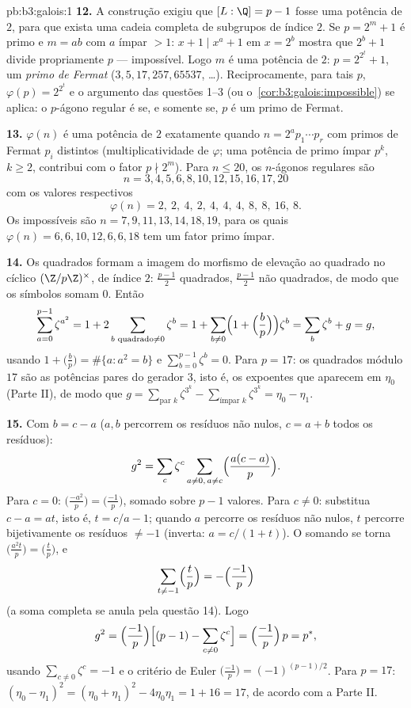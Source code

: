 \begin{solution}{pb:b3:galois:1}
\textbf{12.} A construção exigiu que $[L:\Q] = p - 1$ fosse uma
potência de $2$, para que exista uma cadeia completa de subgrupos
de índice $2$. Se $p = 2^m + 1$ é primo e $m = ab$ com $a$ ímpar
$>
1$: $x + 1 \mid x^a + 1$ em $x = 2^b$ mostra que $2^b + 1$ divide
propriamente $p$ --- impossível. Logo $m$ é uma potência de
$2$: $p =
2^{2^t} + 1$, um \emph{primo de Fermat} ($3, 5, 17, 257, 65537$,
\dots). Reciprocamente, para tais $p$, $\varphi(p) = 2^{2^t}$ e o
argumento das questões 1--3 (ou
o~\cref{cor:b3:galois:impossible}) se aplica: o $p$-ágono regular
é  se, e somente se, $p$ é um primo de Fermat.

\textbf{13.} $\varphi(n)$ é uma potência de $2$ exatamente quando $n =
2^a p_1\cdots p_r$ com primos de Fermat $p_i$ distintos
(multiplicatividade de $\varphi$; uma potência de primo ímpar $p^k$, $k
\geq 2$, contribui com o fator $p \nmid 2^m$). Para $n \leq
20$, os $n$-ágonos regulares  são
\[
n = 3, 4, 5, 6, 8, 10, 12, 15, 16, 17, 20
\]
com os valores respectivos
\[
\varphi(n) = 2,\ 2,\ 4,\ 2,\ 4,\ 4,\ 4,\ 8,\ 8,\ 16,\ 8 .
\]
Os impossíveis são $n = 7, 9, 11, 13, 14, 18, 19$, para os quais
$\varphi(n) = 6, 6, 10, 12, 6, 6, 18$ tem um fator primo ímpar.

\textbf{14.} Os quadrados formam a imagem do morfismo de elevação ao
quadrado no cíclico $(\Z/p\Z)^\times$, de índice $2$:
$\frac{p-1}2$ quadrados, $\frac{p-1}2$ não quadrados, de modo que os
símbolos somam $0$. Então
\[
\sum_{a=0}^{p-1}\zeta^{a^2} = 1 + 2\sum_{b \text{ quadrado}
\neq 0}\zeta^b
= 1 + \sum_{b\neq0}\Bigl(1 + \Bigl(\frac bp\Bigr)\Bigr)
\zeta^b = \sum_{b}\zeta^b + g = g,
\]
usando $1 + \bigl(\frac bp\bigr) = \#\{a : a^2 = b\}$ e
$\sum_{b=0}^{p-1}\zeta^b = 0$. Para $p = 17$: os quadrados módulo
$17$ são as potências pares do gerador $3$, isto é, os
expoentes que aparecem em $\eta_0$ (Parte II), de modo que $g =
\sum_{\text{par }k}\zeta^{3^k} - \sum_{\text{ímpar }k}
\zeta^{3^k} = \eta_0 - \eta_1$.

\textbf{15.} Com $b = c - a$ ($a, b$ percorrem os resíduos
não nulos, $c = a + b$ todos os resíduos):
\[
g^2 = \sum_c\zeta^c\sum_{a\neq0,\,a\neq c}
\Bigl(\frac{a(c-a)}p\Bigr) .
\]
Para $c = 0$: $\bigl(\frac{-a^2}p\bigr) =
\bigl(\frac{-1}p\bigr)$, somado sobre $p - 1$ valores. Para $c \neq 0$: substitua $c - a = at$, isto é, $t = c/a -
1$; quando $a$ percorre os resíduos não nulos, $t$ percorre
bijetivamente os resíduos $\neq -1$ (inverta: $a = c/(1 +
t)$). O somando se torna $\bigl(\frac{a^2t}p\bigr) =
\bigl(\frac tp\bigr)$, e
\[
\sum_{t \neq -1}\Bigl(\frac tp\Bigr)
= -\Bigl(\frac{-1}p\Bigr)
\]
(a soma completa se anula pela questão 14). Logo
\[
g^2 = \Bigl(\frac{-1}p\Bigr)\Bigl[(p-1) -
\sum_{c\neq0}\zeta^c\Bigr]
= \Bigl(\frac{-1}p\Bigr)\,p = p^* ,
\]
usando $\sum_{c\neq0}\zeta^c = -1$ e o critério de Euler
$\bigl(\frac{-1}p\bigr) = (-1)^{(p-1)/2}$. Para $p = 17$:
$(\eta_0 - \eta_1)^2 = (\eta_0 + \eta_1)^2 - 4\eta_0\eta_1 =
1 + 16 = 17$, de acordo com a Parte II.


\end{solution}
